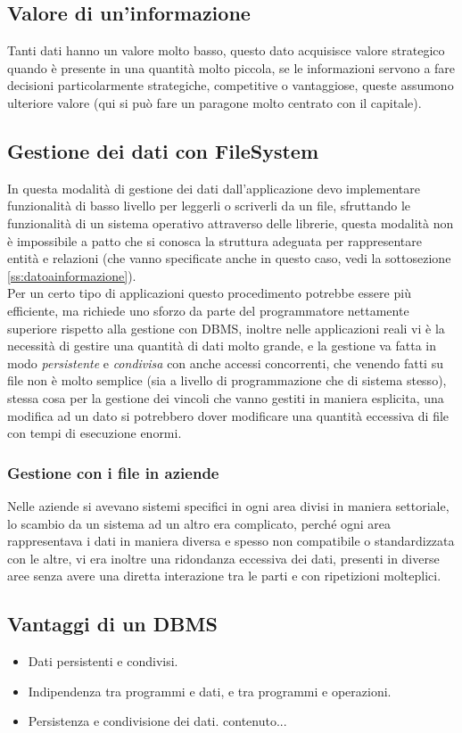 \documentclass[a4paper,12pt]{report}
\begin{document}
\subsection{Valore di un'informazione}
Tanti dati hanno un valore molto basso, questo dato acquisisce valore strategico quando è presente in una quantità molto piccola, se le informazioni servono a fare decisioni particolarmente strategiche, competitive o vantaggiose, queste assumono ulteriore valore (qui si può fare un paragone molto centrato con il capitale).
\subsection{Gestione dei dati con FileSystem}
In questa modalità di gestione dei dati dall'applicazione devo implementare funzionalità di basso livello per leggerli o scriverli da un file, sfruttando le funzionalità di un sistema operativo attraverso delle librerie, questa modalità non è impossibile a patto che si conosca la struttura adeguata per rappresentare entità e relazioni (che vanno specificate anche in questo caso, vedi la sottosezione \ref{ss:datoainformazione}).\\
Per un certo tipo di applicazioni questo procedimento potrebbe essere più efficiente, ma richiede uno sforzo da parte del programmatore nettamente superiore rispetto alla gestione con DBMS, inoltre nelle applicazioni reali vi è la necessità di gestire una quantità di dati molto grande, e la gestione va fatta in modo \textit{persistente} e \textit{condivisa} con anche accessi concorrenti, che venendo fatti su file non è molto semplice (sia a livello di programmazione che di sistema stesso), stessa cosa per la gestione dei vincoli che vanno gestiti in maniera esplicita, una modifica ad un dato si potrebbero dover modificare una quantità eccessiva di file con tempi di esecuzione enormi.
\subsubsection*{Gestione con i file in aziende}
Nelle aziende si avevano sistemi specifici in ogni area divisi in maniera settoriale, lo scambio da un sistema ad un altro era complicato, perché ogni area rappresentava i dati in maniera diversa e spesso non compatibile o standardizzata con le altre, vi era inoltre una ridondanza eccessiva dei dati, presenti in diverse aree senza avere una diretta interazione tra le parti e con ripetizioni molteplici.
\subsection{Vantaggi di un DBMS}
\begin{itemize}
	\item Dati persistenti e condivisi.
	\item Indipendenza tra programmi e dati, e tra programmi e operazioni.
	\item Persistenza e condivisione dei dati.
	contenuto...
\end{itemize}
\end{document}
